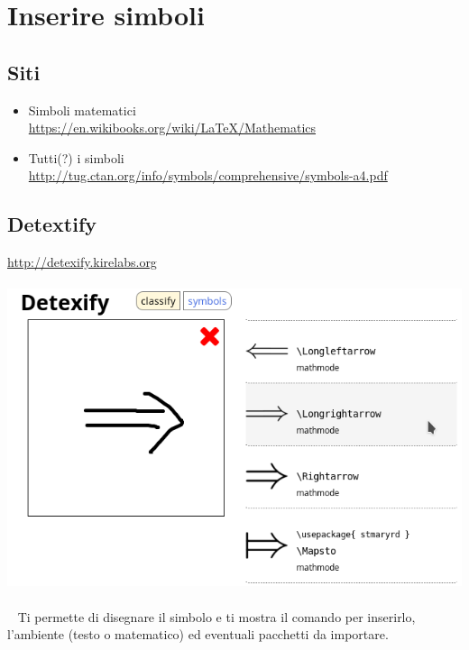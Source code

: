\section{Inserire simboli}
\subsection{Siti}
  \begin{itemize}
    \item Simboli matematici\\
      \url{https://en.wikibooks.org/wiki/LaTeX/Mathematics}
    \item Tutti(?) i simboli\\
      \url{http://tug.ctan.org/info/symbols/comprehensive/symbols-a4.pdf}
  \end{itemize}
\subsection{Detextify}
  \url{http://detexify.kirelabs.org}
  ~\\~\includegraphics[width=\textwidth]{img/detex}~\\~
  Ti permette di disegnare il simbolo e ti mostra il comando per inserirlo, l'ambiente (testo o matematico) ed eventuali pacchetti da importare.


